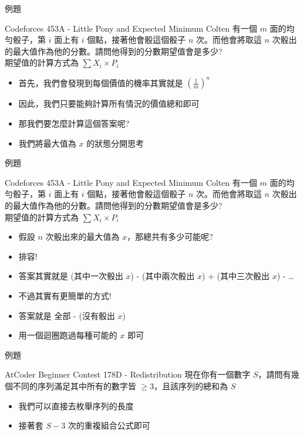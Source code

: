 \documentclass[aspectratio=169]{beamer}
\begin{document}
\begin{frame}{例題}
    \begin{block}{Codeforces 453A - Little Pony and Expected Minimum}
        Colten 有一個 $m$ 面的均勻骰子，第 $i$ 面上有 $i$ 個點，接著他會骰這個骰子 $n$ 次。而他會將取這 $n$ 次骰出的最大值作為他的分數。請問他得到的分數期望值會是多少? \\
        \vspace{5mm}
        期望值的計算方式為 $\sum X_i \times P_i$
    \end{block} \pause
    \begin{itemize}
        \item<1-> 首先，我們會發現到每個價值的機率其實就是 $(\frac{1}{m})^n$
        \item<2-> 因此，我們只要能夠計算所有情況的價值總和即可
        \item<3-> 那我們要怎麼計算這個答案呢?
        \item<4-> 我們將最大值為 $x$ 的狀態分開思考
    \end{itemize}
\end{frame}

\begin{frame}{例題}
    \begin{block}{Codeforces 453A - Little Pony and Expected Minimum}
        Colten 有一個 $m$ 面的均勻骰子，第 $i$ 面上有 $i$ 個點，接著他會骰這個骰子 $n$ 次。而他會將取這 $n$ 次骰出的最大值作為他的分數。請問他得到的分數期望值會是多少? \\
        \vspace{5mm}
        期望值的計算方式為 $\sum X_i \times P_i$
    \end{block} \pause
    \begin{itemize}
        \item<1-> 假設 $n$ 次骰出來的最大值為 $x$，那總共有多少可能呢?
        \item<2-> 排容! 
        \item<3-> 答案其實就是 (其中一次骰出 $x$) - (其中兩次骰出 $x$) + (其中三次骰出 $x$) - \dots
        \item<4-> 不過其實有更簡單的方式! 
        \item<4-> 答案就是 全部 - (沒有骰出 $x$)
        \item<5-> 用一個迴圈跑過每種可能的 $x$ 即可
    \end{itemize}
\end{frame}

\begin{frame}{例題}
    \begin{block}{AtCoder Beginner Contest 178D - Redistribution}
        現在你有一個數字 $S$，請問有幾個不同的序列滿足其中所有的數字皆 $\ge 3$，且該序列的總和為 $S$
    \end{block} \pause
    \begin{itemize}
        \item 我們可以直接去枚舉序列的長度
        \item 接著套 $S-3$ 次的重複組合公式即可
    \end{itemize}
\end{frame}
\end{document}
